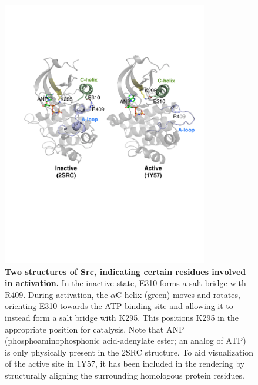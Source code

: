 \documentclass[aps,prl,preprint,nofootinbib,superscriptaddress,linenumbers]{revtex4-1}
\begin{document}
\begin{figure}[tb]
    \includegraphics[width=0.8\textwidth]{residue_pair_distances/src/src_ref_structures}

    \caption{\footnotesize {\bf Two structures of Src, indicating certain residues involved in activation.}
    In the inactive state, E310 forms a salt bridge with R409.
    During activation, the $\alpha$C-helix (green) moves and rotates, orienting E310 towards the ATP-binding site and allowing it to instead form a salt bridge with K295.
    This positions K295 in the appropriate position for catalysis.
    Note that ANP (phosphoaminophosphonic acid-adenylate ester; an analog of ATP) is only physically present in the 2SRC structure.
    To aid visualization of the active site in 1Y57, it has been included in the rendering by structurally aligning the surrounding homologous protein residues.
  }
  \label{figure:src-ref-structures}
\end{figure}
\end{document}
